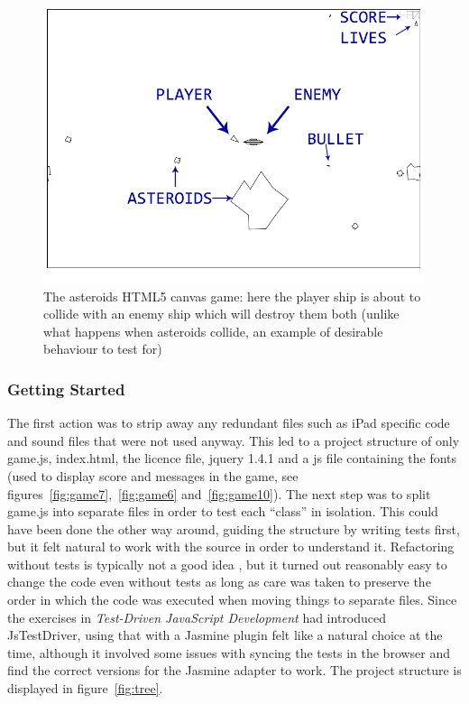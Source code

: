 \documentclass[11pt]{article}
\begin{document}
\begin{figure}[ht!]
\centering
\includegraphics[width=1.0\textwidth]{pics/game3.png}
\caption{The asteroids HTML5 canvas game: here the player ship is about to collide with an enemy ship which will destroy them both (unlike what happens when asteroids collide, an example of desirable behaviour to test for)}
\label{fig:game3}
\end{figure}

\subsubsection{Getting Started}

The first action was to strip away any redundant files such as iPad specific code and sound files that were not used anyway. This led to a project structure of only game.js, index.html, the licence file, jquery 1.4.1 and a \gls{js} file containing the fonts (used to display score and messages in the game, see figures~\ref{fig:game7},~\ref{fig:game6} and~\ref{fig:game10}). The next step was to split game.js into separate files in order to test each ``class'' in isolation. This could have been done the other way around, guiding the structure by writing tests first, but it felt natural to work with the source in order to understand it. Refactoring without tests is typically not a good idea \cite[p.~17]{Refactoring}, but it turned out reasonably easy to change the code even without tests as long as care was taken to preserve the order in which the code was executed when moving things to separate files. Since the exercises in \emph{Test-Driven JavaScript Development} \cite{Tddjs} had introduced JsTestDriver, using that with a Jasmine plugin felt like a natural choice at the time, although it involved some issues with syncing the tests in the browser and find the correct versions for the Jasmine adapter to work. The project structure is displayed in figure~\ref{fig:tree}.
\end{document}
